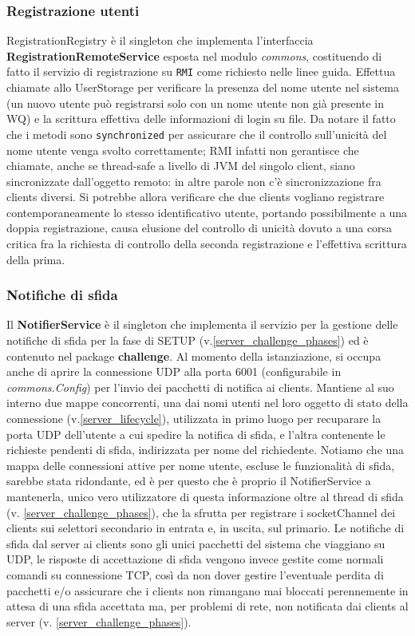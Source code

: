 \documentclass{article}
\begin{document}
    \subsubsection{Registrazione utenti}\label{server_RMI} RegistrationRegistry è il singleton che implementa l'interfaccia \textbf{RegistrationRemoteService} esposta nel modulo \textit{commons}, costituendo di fatto il servizio di registrazione su \texttt{RMI} come richiesto nelle linee guida. Effettua chiamate allo UserStorage per verificare la presenza del nome utente nel sistema (un nuovo utente può registrarsi solo con un nome utente non già presente in WQ) e la scrittura effettiva delle informazioni di login su file. Da notare il fatto che i metodi sono \texttt{synchronized} per assicurare che il controllo sull'unicità del nome utente venga svolto correttamente; RMI infatti non gerantisce che chiamate, anche se thread-safe a livello di JVM del singolo client, siano sincronizzate dall'oggetto remoto: in altre parole non c'è sincronizzazione fra clients diversi. Si potrebbe allora verificare che due clients vogliano registrare contemporaneamente lo stesso identificativo utente, portando possibilmente a una doppia registrazione, causa elusione del controllo di unicità dovuto a una corsa critica fra la richiesta di controllo della seconda registrazione e l'effettiva scrittura della prima.

    \subsubsection{Notifiche di sfida}\label{server_challenge_notification}
    Il \textbf{NotifierService} è il singleton che implementa il servizio per la gestione delle notifiche di sfida per la fase di SETUP (v.\ref{server_challenge_phases}) ed è contenuto nel package \textbf{challenge}. Al momento della istanziazione, si occupa anche di aprire la connessione UDP alla porta 6001 (configurabile in \textit{commons.Config}) per l'invio dei pacchetti di notifica ai clients.
    Mantiene al suo interno due mappe concorrenti, una dai nomi utenti nel loro oggetto di stato della connessione (v.\ref{server_lifecycle}), utilizzata in primo luogo per recuparare la porta UDP dell'utente a cui spedire la notifica di sfida, e l'altra contenente le richieste pendenti di sfida, indirizzata per nome del richiedente. Notiamo che una mappa delle connessioni attive per nome utente, escluse le funzionalità di sfida, sarebbe stata ridondante, ed è per questo che è proprio il NotifierService a mantenerla, unico vero utilizzatore di questa informazione oltre al thread di sfida (v. \ref{server_challenge_phases}), che la sfrutta per registrare i socketChannel dei clients sui selettori secondario in entrata e, in uscita, sul primario.
    \newline Le notifiche di sfida dal server ai clients sono gli unici pacchetti del sistema che viaggiano su UDP, le risposte di accettazione di sfida vengono invece gestite come normali comandi su connessione TCP, così da non dover gestire l'eventuale perdita di pacchetti e/o assicurare che i clients non rimangano mai bloccati perennemente in attesa di una sfida accettata ma, per problemi di rete, non notificata dai clients al server (v. \ref{server_challenge_phases}).
\end{document}
